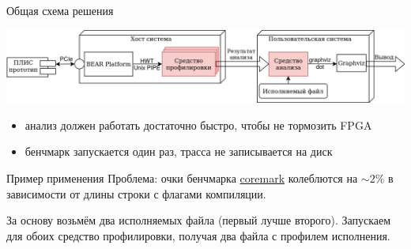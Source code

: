 \documentclass[10pt,aspectratio=169,hyperref={pdftex,unicode},xcolor=dvipsnames]{beamer}
\begin{document}
\begin{frame}{ Общая схема решения }
    \begin{center}
        \includegraphics[width=\textwidth,keepaspectratio]{./images/stac_arch.png}
    \end{center}
    \begin{itemize}
        \pause \item анализ должен работать достаточно быстро, чтобы не тормозить FPGA
        \pause \item бенчмарк запускается один раз, трасса не записывается на диск
    \end{itemize}
\end{frame}

\begin{frame}{ Пример применения }
    Проблема: очки бенчмарка \href{https://github.com/eembc/coremark}{coremark}
    колеблются на $\sim2\%$ в зависимости от длины строки с флагами компиляции.

    За основу возьмём два исполняемых файла (первый лучше второго).
    Запускаем для обоих средство профилировки, получая два файла с профилем исполнения.
\end{frame}
\end{document}
